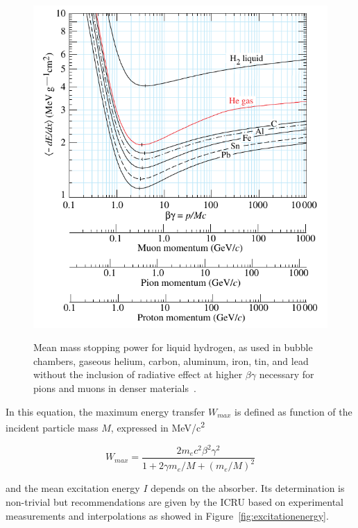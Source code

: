 	\begin{figure}[H]
		\centering
		\includegraphics[width = 0.8\plotwidth]{fig/chapt4/dedx_table_98.pdf}\\
		\caption{\label{fig:enerlyloss} Mean mass stopping power for liquid hydrogen, as used in bubble chambers, gaseous helium, carbon, aluminum, iron, tin, and lead without the inclusion of radiative effect at higher $\beta\gamma$ necessary for pions and muons in denser materials~\cite{PDG2018}.}
	\end{figure}
	
	In this equation, the maximum energy transfer $W_{max}$ is defined as function of the incident particle mass $M$, expressed in \si{MeV/c^2}
	
	\begin{equation}
	\label{eq:maxenergytrans}
	W_{max} = \frac{2m_ec^2\beta^2\gamma^2}{1 + 2\gamma m_e/M + (m_e/M)^2}
	\end{equation}
	
	and the mean excitation energy $I$ depends on the absorber. Its determination is non-trivial but recommendations are given by the \acf{ICRU} based on experimental measurements and interpolations as showed in Figure~\ref{fig:excitationenergy}.
	
